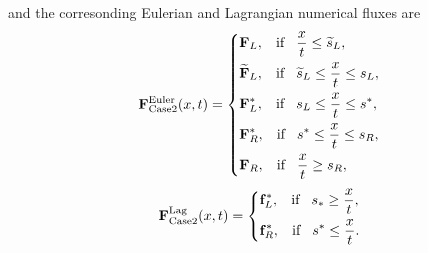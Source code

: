 \documentclass[review]{elsarticle}
\begin{document}
  and the corresonding Eulerian and Lagrangian numerical fluxes are
 \begin{equation}\label{eq:HLLCEP}
   \mathbf{F}^{\text{Euler}}_{\text{Case2}}(x,t) = \left\{ \begin{aligned}
       & \mathbf{F}_L, \hspace{0.3cm} \text{if} \hspace{0.3cm} \frac{x}{t}\le \widetilde{s}_L, \\
        &  \widetilde{\mathbf{F}}_L, \hspace{0.3cm} \text{if} \hspace{0.3cm} \widetilde{s}_L\le \frac{x}{t} \le   s_L , \\
        &\mathbf{F}_L^*, \hspace{0.3cm} \text{if} \hspace{0.3cm} s_L\le \frac{x}{t} \le s^*, \\
        & \mathbf{F}_R^*, \hspace{0.3cm} \text{if} \hspace{0.3cm} s^*\le \frac{x}{t} \le s_R,\\
        & \mathbf{F}_R, \hspace{0.3cm} \text{if} \hspace{0.3cm} \frac{x}{t}\ge s_R, \\
      \end{aligned}
    \right.
  \end{equation}
\begin{equation}
    \mathbf{F}^{\text{Lag}}_{\text{Case2}}(x,t) = \left\{ \begin{aligned}
        & \mathbf{f}_L^*, \hspace{0.3cm} \text{if} \hspace{0.3cm} s_*\ge \frac{x}{t},\\
        & \mathbf{f}_R^*, \hspace{0.3cm} \text{if} \hspace{0.3cm} s^*\le \frac{x}{t}.\\
      \end{aligned}
    \right.
  \end{equation}
%
\end{document}
